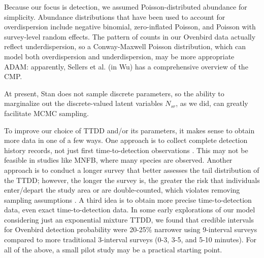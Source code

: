 \documentclass[useAMS,usenatbib,referee,12pt]{article}
\newcommand{\adam}[1]{{\color{blue} ADAM: #1}}
\begin{document}
Because our focus is detection, we assumed Poisson-distributed abundance for simplicity.  Abundance distributions that have been used to account for overdispersion include negative binomial, zero-inflated Poisson, and Poisson with survey-level random effects.  The pattern of counts in our Ovenbird data actually reflect underdispersion, so a Conway-Maxwell Poisson distribution, which can model both overdispersion and underdispersion, may be more appropriate \citep{Wu2015}\adam{apparently, Sellers et al. (in Wu) has a comprehensive overview of the CMP.}



At present, Stan does not sample discrete parameters, so the ability to marginalize out the discrete-valued latent variables $N_{sr}$, as we did, can greatly facilitate MCMC sampling.





To improve our choice of TTDD and/or its parameters, it makes sense to obtain more data in one of a few ways.  One approach is to collect complete detection history records, not just first time-to-detection observations \citep{Alldredge2007}.  This may not be feasible in studies like MNFB, where many species are observed.  Another approach is to conduct a longer survey that better assesses the tail distribution of the TTDD; however, the longer the survey is, the greater the risk that individuals enter/depart the study area or are double-counted, which violates removing sampling assumptions \citep{LeeMarsden2008, Reidy2011}.  A third idea is to obtain more precise time-to-detection data, even exact time-to-detection data.  In some early explorations of our model considering just an exponential mixture TTDD, we found that credible intervals for Ovenbird detection probability were 20-25\% narrower using 9-interval surveys compared to more traditional 3-interval surveys (0-3, 3-5, and 5-10 minutes).  For all of the above, a small pilot study may be a practical starting point.  
\end{document}
